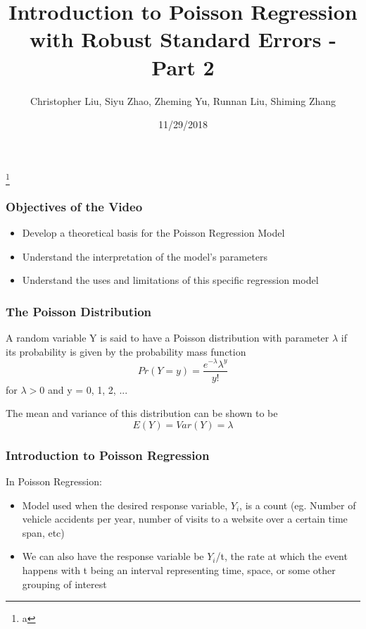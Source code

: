 \documentclass{beamer}
\title{Introduction to Poisson Regression with Robust Standard Errors - Part 2}
\author{Christopher Liu, Siyu Zhao, Zheming Yu, Runnan Liu, Shiming Zhang}
\institute{San Diego State University, Stats 610}
\date{11/29/2018}
\begin{document}
	

\begin{frame}[plain]

	\titlepage
	
	\footnote{a}

\end{frame}



\begin{frame}[fragile]\frametitle{Objectives of the Video}

	\begin{itemize}
	
		\item Develop a theoretical basis for the Poisson Regression Model
		
		\item Understand the interpretation of the model's parameters
		
		\item Understand the uses and limitations of this specific regression model
	
	\end{itemize}	

\end{frame}



\begin{frame}[fragile]\frametitle{The Poisson Distribution}

	A random variable Y is said to have a Poisson distribution with parameter $\lambda$ if its probability is given by the probability mass function
	$$ Pr(Y = y) = \frac{e^{-\lambda}\lambda^{y}}{y!} $$
	for $\lambda > 0$ and y = 0, 1, 2, ... 
 
	The mean and variance of this distribution can be shown to be
	$$ E(Y) = Var(Y) = \lambda $$ 

\end{frame}



\begin{frame}[fragile]\frametitle{Introduction to Poisson Regression}
	In Poisson Regression:
	
	\begin{itemize}
	
		\item Model used when the desired response variable, $Y_{i}$, is a count (eg. Number of vehicle accidents per year, number of visits to a website over a certain time span, etc)
		\item We can also have the response variable be $Y_{i}$/t, the rate at which the event happens with t being an interval representing time, space, or some other grouping of interest

	\end{itemize}

\end{frame}
\end{document}
